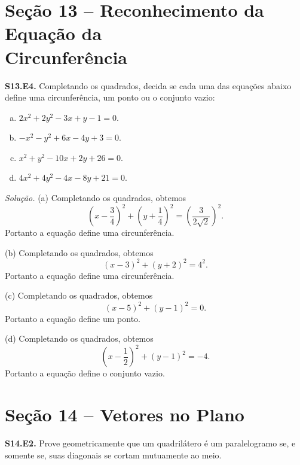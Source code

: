 \documentclass[a4paper,11pt]{article}
\begin{document}
\section*{Seção 13 -- Reconhecimento da Equação da\\Circunferência}

\textbf{S13.E4.}
Completando os quadrados, decida se cada uma das equações abaixo define uma circunferência, um ponto ou o conjunto vazio:
\begin{enumerate}[(a)]
  \item
    $2x^2 + 2y^2 - 3x + y - 1 = 0$.
  \item
    $-x^2 - y^2 + 6x - 4y + 3 = 0$.
  \item
    $x^2 + y^2 - 10x + 2y + 26 = 0$.
  \item
    $4x^2 + 4y^2 - 4x - 8y + 21 = 0$.
\end{enumerate}

\vspace{\baselineskip}

\emph{Solução.}
(a)
Completando os quadrados, obtemos
\[
  \left( x - \frac{3}{4} \right)^2 + \left( y + \frac{1}{4} \right)^2 = \left( \frac{3}{2\sqrt{2}} \right)^2.
\]
Portanto a equação define uma circunferência.

(b)
Completando os quadrados, obtemos
\[
  (x-3)^2 + (y+2)^2 = 4^2.
\]
Portanto a equação define uma circunferência.

(c)
Completando os quadrados, obtemos
\[
  (x-5)^2 + (y-1)^2 = 0.
\]
Portanto a equação define um ponto.

(d)
Completando os quadrados, obtemos
\[
  \left( x - \frac{1}{2} \right)^2 + (y - 1)^2 = -4.
\]
Portanto a equação define o conjunto vazio.

\section*{Seção 14 -- Vetores no Plano}

\textbf{S14.E2.}
Prove geometricamente que um quadrilátero é um paralelogramo se, e somente se, suas diagonais se cortam mutuamente ao meio.

\vspace{\baselineskip}
\end{document}
